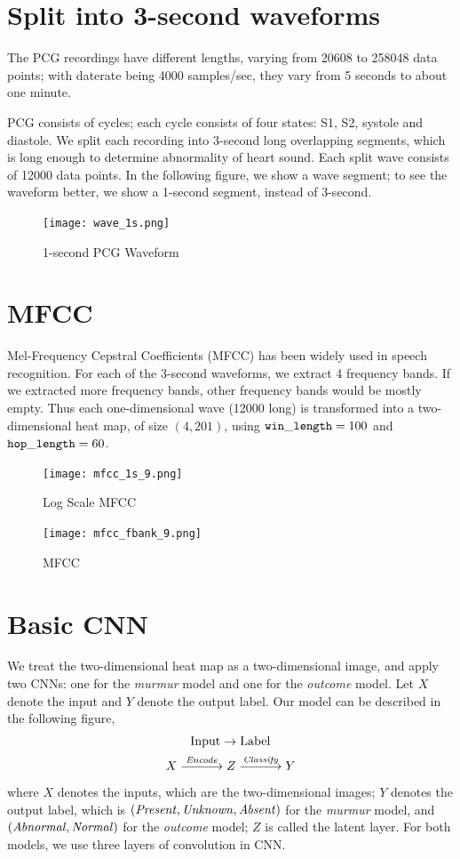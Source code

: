 \documentclass[twocolumn]{cinc}
\begin{document}
\section{Split into 3-second waveforms}

The PCG recordings have different lengths, varying from 20608 to 258048 data points; with daterate being 4000 samples/sec, they vary from 5 seconds to about one minute.

PCG consists of cycles; each cycle consists of four states: S1, S2, systole and diastole. 
We split each recording into 3-second long overlapping segments, which is long enough to determine abnormality of heart sound.
Each split wave consists of 12000 data points. In the following figure, we show a wave segment; to see the waveform better, we show a 1-second segment, instead of 3-second.

\begin{figure}[h]
\centering
\texttt{[image: wave\_1s.png]}
\caption{1-second PCG Waveform}
\label{wave}
\end{figure}


\section{MFCC}

Mel-Frequency Cepstral Coefficients (MFCC) \cite{mfcc} has been widely used in speech recognition. For each of the 3-second waveforms, we extract 4 frequency bands. If we extracted more frequency bands, other frequency bands would be mostly empty. Thus each one-dimensional wave (12000 long) is transformed into a two-dimensional heat map, of size $(4, 201)$, using ${\tt win\_length}=100$ and ${\tt hop\_length}=60$. 

\begin{figure}[h]
\centering
\texttt{[image: mfcc\_1s\_9.png]}
\caption{Log Scale MFCC}
\label{mfcc_db}
\end{figure}

\begin{figure}[h]
\centering
\texttt{[image: mfcc\_fbank\_9.png]}
\caption{MFCC}
\label{mfcc}
\end{figure}


\section{Basic CNN}

We treat the two-dimensional heat map as a two-dimensional image, and apply two CNNs: one for the \textit{murmur} model and one for the \textit{outcome} model. Let $X$ denote the input and $Y$ denote the output label. Our model can be described in the following figure, 
\[\hbox{Input}\to\hbox{Label}\]
\def\mapright#1{\smash{\mathop{\;\relbar\joinrel\relbar\joinrel\relbar\joinrel\longrightarrow\;}\limits^{\it#1}}}
\[  X\mapright{Encode}Z\mapright{Classify}Y\]
where $X$ denotes
the inputs, which are the two-dimensional images; $Y$ denotes the output label, which is $(\it Present, Unknown, Absent)$ for the \textit{murmur} model, and $(\it Abnormal, Normal)$ for the \textit{outcome} model; $Z$ is called the latent layer. For both models, 
we use three layers of convolution in CNN. 
\end{document}
